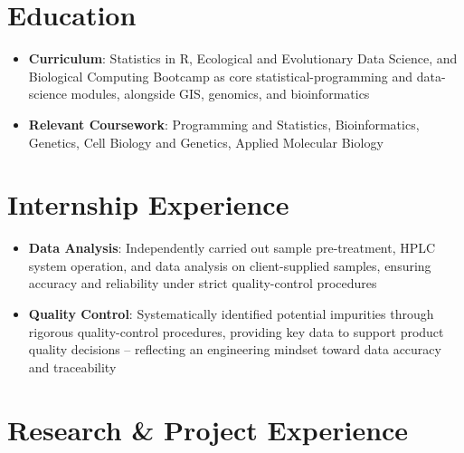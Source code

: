 \documentclass{my-resume}
\begin{document}


\section{Education}
\begin{itemize}[parsep=0.2ex]
  \item \textbf{Curriculum}: Statistics in R, Ecological and Evolutionary Data Science, and Biological Computing Bootcamp as core statistical-programming and data-science modules, alongside GIS, genomics, and bioinformatics
\end{itemize}
\begin{itemize}[parsep=0.2ex]
  \item \textbf{Relevant Coursework}: Programming and Statistics, Bioinformatics, Genetics, Cell Biology and Genetics, Applied Molecular Biology
\end{itemize}

\section{Internship Experience}
\begin{itemize}[parsep=0.2ex]
  \item \textbf{Data Analysis}: Independently carried out sample pre-treatment, HPLC system operation, and data analysis on client-supplied samples, ensuring accuracy and reliability under strict quality-control procedures
  \item \textbf{Quality Control}: Systematically identified potential impurities through rigorous quality-control procedures, providing key data to support product quality decisions -- reflecting an engineering mindset toward data accuracy and traceability
\end{itemize}

\section{Research \& Project Experience}
\end{document}
